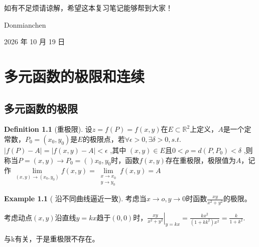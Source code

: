 \documentclass[oneside]{book}
\theoremstyle{definition}
\theoremstyle{definition}
\theoremstyle{cth}
\newtheorem{definition}{Definition}[section]
\theoremstyle{cnthm}
\newtheorem{example}{Example}[section]
\begin{document}
	如有不足烦请谅解，希望这本复习笔记能够帮到大家！
	
	\hfill Donmianchen
	
	\hfill 2026 年 10 月 19 日
	


	
	
	\tableofcontents
	
	
	
	
	
	
	\chapter{多元函数的极限和连续}
	\section{多元函数的极限}
		
		\begin{definition}[重极限]
		
			设$z=f(P)=f(x,y)$在$E\subset \mathbb{R}^2$上定义，$A$是一个定常数，$P_0=(x_0,y_0)$是$E$的极限点，若$\forall \epsilon >0,\exists \delta >0,s.t.$ $\displaystyle |f(P)-A|=|f(x,y)-A|<\epsilon $
			,其中
			$ \displaystyle (x,y)\in E \text{且} 0<\rho =d(P,P_0)<\delta$
			,则称当$P=(x,y)\to P_0=()x_0,y_0$时，函数$f(x,y)$存在重极限，极限值为$A$，记作
			$\displaystyle\lim\limits_{(x,y)\to (x_0,y_0)}f(x,y)=\lim\limits_{\substack{x\to x_0\\ y \to y_0}}f(x,y)=A$
		
		\end{definition}
		
		\begin{example}[ 沿不同曲线逼近一致]
			
			考虑当$x\to o,y \to 0$时函数$\displaystyle\frac{xy}{x^2+y^2}$的极限。
			
			考虑动点$(x,y)$沿直线$y=kx$趋于$(0,0)$时，$\displaystyle \left.\frac{xy}{x^2+y^2}\right |_{y=kx}=\frac{kx^2}{(1+kk^2)x^2}=\frac{k}{1+k^2}$.
			
			与k有关，于是重极限不存在。
			
		\end{example}
		
\end{document}
